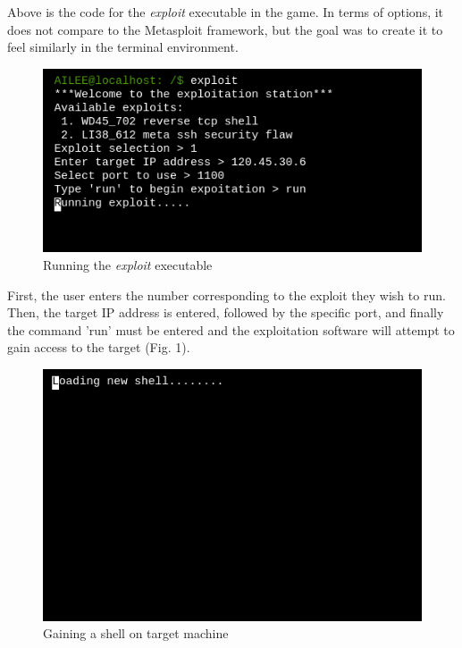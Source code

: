 \documentclass[conference]{IEEEtran}
\begin{document}


Above is the code for the \textit{exploit} executable in the game. In terms of options, it does not compare to the Metasploit framework, but the goal was to create it to feel similarly in the terminal environment.

\begin{figure}[htbp]
	\centerline{\includegraphics[scale=2]{exploit-pic}}
	\caption{Running the \textit{exploit} executable}
	\label{fig}
\end{figure}

First, the user enters the number corresponding to the exploit they wish to run. Then, the target IP address is entered, followed by the specific port, and finally the command 'run' must be entered and the exploitation software will attempt to gain access to the target (Fig. 1). 

\begin{figure}[htbp]
	\centerline{\includegraphics[scale=2]{loading-new-shell}}
	\caption{Gaining a shell on target machine}
	\label{fig}
\end{figure}
\end{document}
